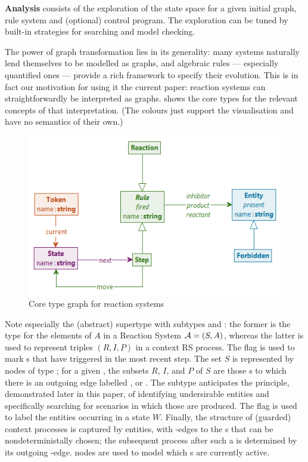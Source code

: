 \textbf{Analysis} consists of the exploration of the state space for a given initial graph, rule system and (optional) control program. The exploration can be tuned by built-in strategies for searching and model checking.

\smallskip\noindent
The power of graph transformation lies in its generality: many systems naturally lend themselves to be modelled as graphs, and algebraic rules --- especially quantified ones --- provide a rich framework to specify their evolution. This is in fact our motivation for using it the current paper: reaction systems can straightforwardly be interpreted as graphs.  shows the core types for the relevant concepts of that interpretation. (The colours just support the visualisation and have no semantics of their own.)

\begin{figure}
\centering
\includegraphics[scale=.5]{figs/core-type}
\caption{Core type graph for reaction systems}
\label{fig:core-type}
\end{figure}
%
Note especially the (abstract) supertype \Rule with subtypes \Reaction and \Step: the former is the type for the elements of $A$ in a Reaction System ${\cal A}=(S,A)$, whereas the latter is used to represent triples $(R,I,P)$ in a context RS process. The flag \fired is used to mark \Rule{}s that have triggered in the most recent step. The set $S$ is represented by nodes of type \Entity; for a given \Rule, the subsets $R$, $I$, and $P$ of $S$ are those \Entity{}s to which there is an outgoing edge labelled \reactant, \inhibitor or \product. The subtype \Forbidden anticipates the principle, demonstrated later in this paper, of identifying undersirable entities and specifically searching for scenarios in which those are produced. The flag \present is used to label the entities occurring in a state $W$. Finally, the structure of (guarded) context processes is captured by \State entities, with \nextt-edges to the \Step{}s that can be nondeterministally chosen; the subsequent process after such a \Step is determined by its outgoing \move-edge. \Token nodes are used to model which \State{}s are currently active.

